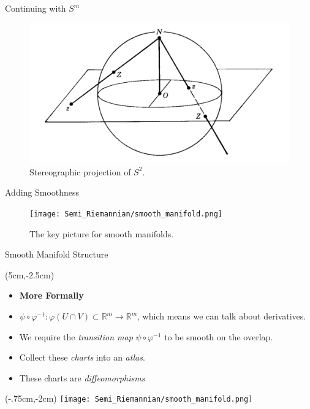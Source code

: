 \documentclass[usenames,dvipsnames]{beamer}
\theoremstyle{definition}
\theoremstyle{theorem}
\newcommand{\R}{\mathbb{R}}
\begin{document}
    \begin{frame}{Continuing with $S^m$}
        \begin{example}
            \begin{figure}
                \centering
                 \includegraphics[scale=0.3]{Topological_Hydrodynamics/stereographic.png}
                \caption{Stereographic projection of $S^2$.}
            \end{figure}
        \end{example}
    \end{frame}
    
    \begin{frame}{Adding Smoothness}
        \begin{figure}
            \centering
            \texttt{[image: Semi\_Riemannian/smooth\_manifold.png]}
            \caption{The key picture for smooth manifolds.}
            \label{fig:my_label}
        \end{figure}
    \end{frame}
    
    \begin{frame}{Smooth Manifold Structure}
        \begin{textblock*}{6cm}(5cm,-2.5cm)            \begin{itemize}
        \item[] \textbf{More Formally}
                \item $\psi \circ \varphi^{-1} \colon \varphi(U \cap V)\subset \R^m \to \R^m$,
                which means we can talk about derivatives.
                \item We require the \emph{transition map} $\psi \circ \varphi^{-1}$ to be smooth on the overlap.
                \item Collect these \emph{charts} into an \emph{atlas}. 
                \item These charts are \emph{diffeomorphisms}
            \end{itemize}
            \end{textblock*}
            \begin{textblock*}{5cm}(-.75cm,-2cm)
            \texttt{[image: Semi\_Riemannian/smooth\_manifold.png]}
            \end{textblock*}
        \end{frame}
        
\end{document}
